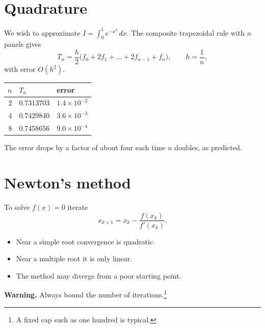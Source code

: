 \documentclass[10pt,a4paper]{article}
\begin{document}
\section{Quadrature}
We wish to approximate $I=\int_0^1 e^{-x^2}\,dx$. The composite trapezoidal rule with $n$ panels gives
\begin{equation}
T_n=\frac h2\bigl(f_0+2f_1+\dots+2f_{n-1}+f_n\bigr),\qquad h=\frac1n,
\end{equation}
with error $O(h^2)$.

\begin{center}
\begin{tabular}{|r|l|l|}
\hline
$n$ & $T_n$ & error\\ \hline
2 & 0.7313703 & $1.4\times10^{-2}$\\
4 & 0.7429840 & $3.6\times10^{-3}$\\
8 & 0.7458656 & $9.0\times10^{-4}$\\ \hline
\end{tabular}
\end{center}
The error drops by a factor of about four each time $n$ doubles, as predicted.

\section{Newton's method}
To solve $f(x)=0$ iterate
\[
x_{k+1}=x_k-\frac{f(x_k)}{f'(x_k)}.
\]
\begin{itemize}
\item Near a simple root convergence is quadratic.
\item Near a multiple root it is only linear.
\item The method may diverge from a poor starting point.
\end{itemize}
\textbf{Warning.} Always bound the number of iterations.\footnote{A fixed cap such as one hundred is typical.}
\end{document}
